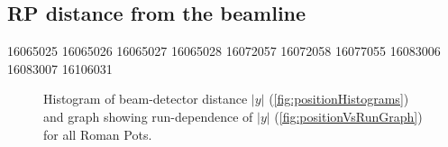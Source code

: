 \subsection{RP distance from the beamline}

16065025
16065026
16065027
16065028
16072057
16072058
16077055
16083006
16083007
16106031

\begin{figure}[hb]
\centering
\parbox{0.4\textwidth}{
  \centering
  \begin{subfigure}[b]{\linewidth}{
                }
  \end{subfigure}
}
\quad
\parbox{0.545\textwidth}{
  \centering
  \begin{subfigure}[b]{\linewidth}{
                }
  \end{subfigure}
}%
\caption[Beam-detector distance of the Roman Pots in run 15.]{Histogram of beam-detector distance $|y|$ (\ref{fig:positionHistograms}) and graph showing run-dependence of $|y|$ (\ref{fig:positionVsRunGraph}) for all Roman Pots.}%
\end{figure}
